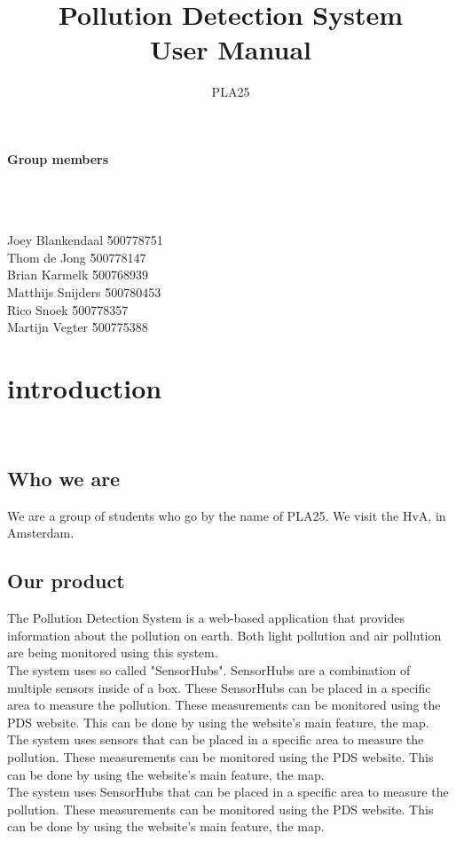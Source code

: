\documentclass[a4paper]{article}
\title{Pollution Detection System\\User Manual}
\author{PLA25}
\begin{document}
\clearpage
\maketitle
\vspace*{\fill}
\paragraph{Group members}
~\\\\
\begin{tabbing}
Joey Blankendaal \` 500778751
\\
Thom de Jong \` 500778147
\\
Brian Karmelk \` 500768939
\\
Matthijs Snijders \` 500780453
\\
Rico Snoek \` 500778357
\\
Martijn Vegter \` 500775388
\end{tabbing}
\thispagestyle{empty}
\setcounter{page}{0}
\pagebreak
\tableofcontents
\pagebreak

\section{introduction}
~\\

\subsection{Who we are}
We are a group of students who go by the name of PLA25. We visit the HvA, in Amsterdam.
~\\

\subsection{Our product}
The Pollution Detection System is a web-based application that provides information about the pollution on earth. Both light pollution and air pollution are being monitored using this system.
\\
The system uses so called "SensorHubs". SensorHubs are a combination of multiple sensors inside of a box. These SensorHubs can be placed in a specific area to measure the pollution. These measurements can be monitored using the PDS website. This can be done by using the website's main feature, the map.
The system uses sensors that can be placed in a specific area to measure the pollution. These measurements can be monitored using the PDS website. This can be done by using the website's main feature, the map.
\\
The system uses SensorHubs that can be placed in a specific area to measure the pollution. These measurements can be monitored using the PDS website. This can be done by using the website's main feature, the map.
\end{document}

